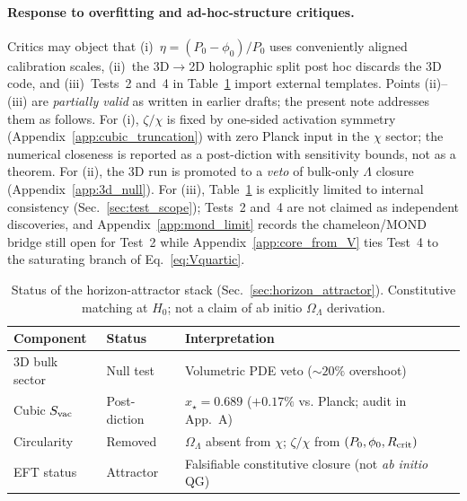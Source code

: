 \documentclass[prd,
               reprint,
               aps,
               preprintnumbers,
               nofootinbib,
               longbibliography,
               floatfix]{revtex4-2}
\begin{document}
\paragraph{Response to overfitting and ad-hoc-structure critiques.}
Critics may object that (i)~$\eta=(P_0-\phi_0)/P_0$ uses conveniently
aligned calibration scales, (ii)~the 3D$\to$2D holographic split
post hoc discards the 3D code, and (iii)~Tests~2 and~4 in
Table~\ref{tab:validation} import external templates.
Points (ii)--(iii) are \emph{partially valid} as written in earlier
drafts; the present note addresses them as follows.
For (i), $\zeta/\chi$ is fixed by one-sided activation symmetry
(Appendix~\ref{app:cubic_truncation}) with zero Planck input in the
$\chi$ sector; the numerical closeness is reported as a post-diction
with sensitivity bounds, not as a theorem.
For (ii), the 3D run is promoted to a \emph{veto} of bulk-only
$\Lambda$ closure (Appendix~\ref{app:3d_null}).
For (iii), Table~\ref{tab:validation} is explicitly limited to
internal consistency (Sec.~\ref{sec:test_scope}); Tests~2 and~4 are
not claimed as independent discoveries, and Appendix~\ref{app:mond_limit}
records the chameleon/MOND bridge still open for Test~2 while
Appendix~\ref{app:core_from_V} ties Test~4 to the saturating branch of
Eq.~\eqref{eq:Vquartic}.

\begin{table}[t]
\caption{Status of the horizon-attractor stack (Sec.~\ref{sec:horizon_attractor}). 
Constitutive matching at $H_0$; not a claim of ab initio $\Omega_\Lambda$ 
derivation.}
\label{tab:validation}
\centering
\begin{tabular}{lll}
\hline\hline
Component & Status & Interpretation \\
\hline
3D bulk sector & Null test & Volumetric PDE veto 
($\sim 20\%$ overshoot) \\
Cubic $S_{\rm vac}$ & Post-diction & $x_\star = 0.689$ 
($+0.17\%$ vs. Planck; audit in App.~A) \\
Circularity & Removed & $\Omega_\Lambda$ absent from $\chi$; 
$\zeta/\chi$ from $(P_0, \phi_0, R_{\rm crit})$ \\
EFT status & Attractor & Falsifiable constitutive closure 
(not \textit{ab initio} QG) \\
\hline\hline
\end{tabular}
\end{table}

\end{document}
